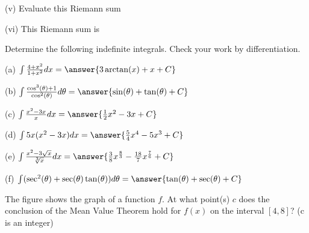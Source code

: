 \documentclass{ximera}
\begin{document}
\begin{exercise}
(v) Evaluate this Riemann sum
\begin{multipleChoice}
\end{multipleChoice}

(vi) This Riemann sum is
\begin{multipleChoice}
\end{multipleChoice}
\end{exercise}

\begin{exercise}
Determine the following indefinite integrals.  Check your work by differentiation.

(a) $\int\frac{4+x^2}{1+x^2}dx=\answer{3\arctan(x)+x +C}$

(b) $\int\frac{\cos^3(\theta)+1}{\cos^2(\theta)}d\theta=\answer{\sin(\theta )+\tan(\theta)+C}$

(c) $\int\frac{x^2-3x}{x}dx=\answer{\frac{1}{2}x^2-3x+C}$

(d) $\int 5x(x^2-3x)dx=\answer{\frac{5}{4}x^4-5x^3+C}$

(e) $\int\frac{x^2-3\sqrt{x}}{\sqrt[3]{x}}dx = \answer{\frac{3}{8}x^{\frac{8}{3}}-\frac{18}{7}x^\frac{7}{6}+C}$

(f) $\int(\sec^2(\theta)+\sec(\theta)\tan(\theta))d\theta=\answer{\tan(\theta)+\sec(\theta)+C}$
\end{exercise}

\begin{exercise}
The figure shows the graph of a function $f$. At what point(s) $c$ does the conclusion of the Mean Value Theorem hold for $f(x)$ on the interval $[4,8]$? (c is an integer)

\begin{image}
\end{image}


\begin{selectAll}
\end{selectAll}
\end{exercise}
\end{document}
